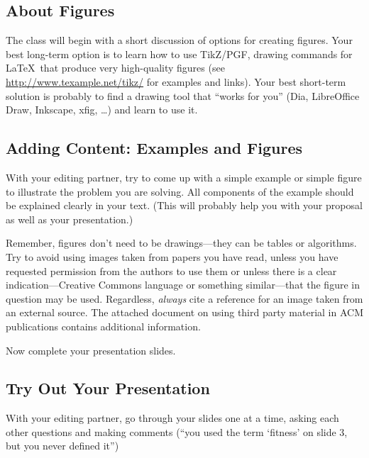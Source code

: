 \subsection*{About Figures}
The class will begin with a short discussion of options for creating
figures. Your best long-term option is to learn how to use
TikZ/PGF, drawing commands for \LaTeX\ that produce very high-quality figures
(see \url{http://www.texample.net/tikz/} for examples and links).
Your best short-term solution is probably
 to find a drawing tool that ``works for you'' (Dia, LibreOffice Draw,
 Inkscape, xfig, \ldots) and learn to use it.

\subsection*{Adding Content: Examples and Figures}
With your editing partner, try to come up with a simple example or simple
figure to illustrate the problem you are solving. All components of the
example should be explained clearly in your text.
(This will probably help you with your proposal as well as your
presentation.)

Remember, figures don't need to be drawings---they can be tables or
algorithms. Try to avoid using images taken from papers you have read,
unless you have requested permission from the authors to use them or
unless there is a clear indication---Creative Commons language or something
similar---that the figure in question may be used. Regardless, {\em always}
cite a reference for an image taken from an external source. The attached
document on using third party material in ACM publications contains additional 
information.

Now complete your presentation slides. 

\subsection*{Try Out Your Presentation}
With your editing partner, go through your slides one at a time, asking each
other questions and making comments (``you used the term 
`fitness' on slide 3, but you never defined it'')

